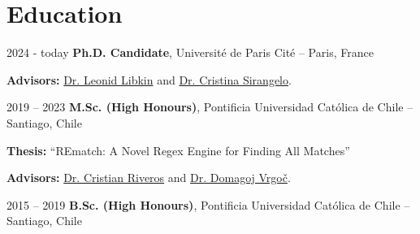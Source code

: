 \section{Education}

\begin{twocolentry}{
    2024 - today
}
\textbf{Ph.D. Candidate}, Université de Paris Cité -- Paris, France
\end{twocolentry}
\vspace{0.1 cm}

\begin{onecolentry}
    \begin{highlights}
        \item \textbf{Advisors:} \href{http://libk.in/}{Dr. Leonid Libkin} and \href{https://www.irif.fr/~cristina/}{Dr. Cristina Sirangelo}.
    \end{highlights}
\end{onecolentry}
\vspace{0.2 cm}

\begin{twocolentry}{
    2019 – 2023
}
    \textbf{M.Sc. (High Honours)}, Pontificia Universidad Católica de Chile -- Santiago, Chile\end{twocolentry}

\vspace{0.10 cm}
\begin{onecolentry}
    \begin{highlights}
        \item \textbf{Thesis:} ``REmatch: A Novel Regex Engine for Finding All Matches''
        \item \textbf{Advisors:} \href{https://criveros.sitios.ing.uc.cl/}{Dr. Cristian Riveros} and \href{https://dvrgoc.ing.puc.cl/}{Dr. Domagoj Vrgoč}.
    \end{highlights}
\end{onecolentry}

\vspace{0.2 cm}

\begin{twocolentry}{
    2015 – 2019
}
    \textbf{B.Sc. (High Honours)}, Pontificia Universidad Católica de Chile -- Santiago, Chile\end{twocolentry} 